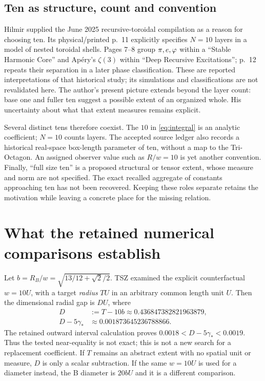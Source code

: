 \subsection{Ten as structure, count and convention}
Hilmir supplied the June 2025 recursive-toroidal compilation as a reason for choosing ten. Its physical/printed p.~11 explicitly specifies $N=10$ layers in a model of nested toroidal shells. Pages 7--8 group $\pi,e,\varphi$ within a ``Stable Harmonic Core'' and Ap\'ery's $\zeta(3)$ within ``Deep Recursive Excitations''; p.~12 repeats their separation in a later phase classification. These are reported interpretations of that historical study; its simulations and classifications are not revalidated here. The author's present picture extends beyond the layer count: base one and fuller ten suggest a possible extent of an organized whole. His uncertainty about what that extent measures remains explicit.~\cite{Toroidal,Intent}

Several distinct tens therefore coexist. The $10$ in \eqref{eq:integral} is an analytic coefficient; $N=10$ counts layers. The accepted source ledger also records a historical real-space box-length parameter of ten, without a map to the Tri-Octagon. An assigned observer value such as $R/w=10$ is yet another convention. Finally, ``full size ten'' is a proposed structural or tensor extent, whose measure and norm are not specified. The exact recalled aggregate of constants approaching ten has not been recovered. Keeping these roles separate retains the motivation while leaving a concrete place for the missing relation.~\cite[Sec.~14; App.~E]{SP}~\cite{Intent,TSZReview}

\section{What the retained numerical comparisons establish}
Let $b=R_B/w=\sqrt{13/12+\sqrt2/2}$. TSZ examined the explicit counterfactual $w=10U$, with a target \emph{radius} $TU$ in an arbitrary common length unit $U$. Then the dimensional radial gap is $DU$, where
\begin{align}
D&:=T-10b\approx0.436847382821963879,\label{eq:D}\\
D-5\gamma_*&\approx0.001873645236788866 .\label{eq:mismatch}
\end{align}
The retained outward interval calculation proves $0.0018<D-5\gamma_*<0.0019$. Thus the tested near-equality is not exact; this is not a new search for a replacement coefficient. If $T$ remains an abstract extent with no spatial unit or measure, $D$ is only a scalar subtraction. If the same $w=10U$ is used for a diameter instead, the B diameter is $20bU$ and it is a different comparison.~\cite{TSZZeta,TSZReview}

